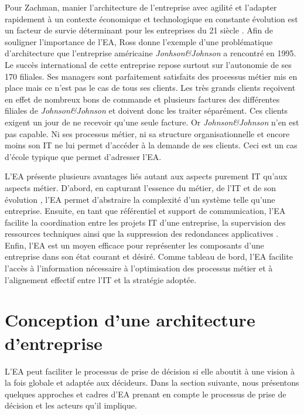 
Pour Zachman, manier l'architecture de l'entreprise avec agilité et l'adapter
rapidement à un contexte économique et technologique en constante évolution est
un facteur de survie déterminant pour les entreprises du 21 siècle
\cite{zachman1997enterprise}. Afin de souligner l'importance de l'EA, Ross
\cite{rossyoutube} donne l'exemple d'une problématique d'architecture que
l'entreprise américaine \textit{Jonhson\&Johnson} a rencontré en 1995. Le
succès international de cette entreprise repose surtout sur l'autonomie de ses
170 filiales. Ses managers sont parfaitement satisfaits des processus métier
mis en place mais ce n'est pas le cas de tous ses clients. Les très grands
clients reçoivent en effet de nombreux bons de commande et plusieurs factures
des différentes filiales de \textit{Johnson\&Johnson} et doivent donc les
traiter séparément.  Ces clients exigent un jour de ne recevoir qu'une seule
facture. Or \textit{Johnson\&Johnson} n'en est pas capable. Ni ses processus
métier, ni sa structure organisationnelle et encore moins son IT ne lui permet
d'accéder à la demande de ses clients. Ceci est un cas d'école typique que
permet d'adresser l'EA.

L'EA présente plusieurs avantages liés autant aux aspects purement IT qu'aux
aspects métier. D'abord, en capturant l'essence du métier, de l'IT et de son
évolution \cite{lankhorst2013enterprise}, l'EA permet d'abstraire la
complexité d'un système telle qu'une entreprise. Ensuite, en tant que
référentiel et support de communication, l'EA facilite la coordination entre les
projets IT d'une entreprise, la supervision des ressources techniques ainsi que
la suppression des redondances applicatives \cite{shah2007frameworks}. Enfin,
l'EA est un moyen efficace pour représenter les composants d'une entreprise
dans son état courant et désiré. Comme tableau de bord, l'EA facilite l'accès à
l'information nécessaire à l'optimisation des processus métier et à
l'alignement effectif entre l'IT et la stratégie adoptée. 

\section{Conception d'une architecture d'entreprise}
\label{sec:conception_EA}

L'EA peut faciliter le processus de prise de décision si elle aboutit à une
vision à la fois globale et adaptée aux décideurs. Dans la section suivante, nous
présentons quelques approches et cadres d'EA prenant en compte le processus de
prise de décision et les acteurs qu'il implique.

